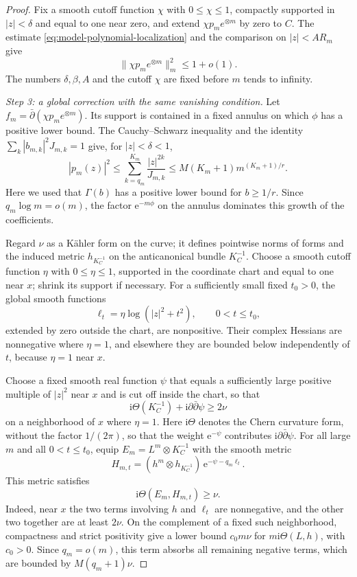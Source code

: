 \begin{proof}
Fix a smooth cutoff function $\chi$ with $0\leq\chi\leq1$, compactly supported in $|z|<\delta$ and equal to one near zero, and extend $\chi p_m e^{\otimes m}$ by zero to $C$. The estimate \eqref{eq:model-polynomial-localization} and the comparison on $|z|<A R_m$ give
\begin{equation}\label{eq:cutoff-polynomial-norm}
 \|\chi p_m e^{\otimes m}\|_m^2\leq1+o(1).
\end{equation}
The numbers $\delta,\beta,A$ and the cutoff $\chi$ are fixed before $m$ tends to infinity.

\emph{Step 3: a global correction with the same vanishing condition.}
Let $f_m=\bar\partial(\chi p_m e^{\otimes m})$. Its support is contained in a fixed annulus on which $\phi$ has a positive lower bound. The Cauchy--Schwarz inequality and the identity $\sum_k|b_{m,k}|^2J_{m,k}=1$ give, for $|z|<\delta<1$,
\[
 |p_m(z)|^2\leq\sum_{k=q_m}^{K_m}\frac{|z|^{2k}}{J_{m,k}}
 \leq M(K_m+1)m^{(K_m+1)/r}.
\]
Here we used that $\Gamma(b)$ has a positive lower bound for $b\geq1/r$. Since $q_m\log m=o(m)$, the factor $\mathrm{e}^{-m\phi}$ on the annulus dominates this growth of the coefficients.

Regard $\nu$ as a K\"ahler form on the curve; it defines pointwise norms of forms and the induced metric $h_{K_C^{-1}}$ on the anticanonical bundle $K_C^{-1}$. Choose a smooth cutoff function $\eta$ with $0\leq\eta\leq1$, supported in the coordinate chart and equal to one near $x$; shrink its support if necessary. For a sufficiently small fixed $t_0>0$, the global smooth functions
\[
 \ell_t=\eta\log(|z|^2+t^2),\qquad 0<t\leq t_0,
\]
extended by zero outside the chart, are nonpositive. Their complex Hessians are nonnegative where $\eta=1$, and elsewhere they are bounded below independently of $t$, because $\eta=1$ near $x$.

Choose a fixed smooth real function $\psi$ that equals a sufficiently large positive multiple of $|z|^2$ near $x$ and is cut off inside the chart, so that
\[
 \mathrm{i}\Theta(K_C^{-1})+\mathrm{i}\partial\bar\partial\psi\geq2\nu
\]
on a neighborhood of $x$ where $\eta=1$. Here $\mathrm{i}\Theta$ denotes the Chern curvature form, without the factor $1/(2\pi)$, so that the weight $\mathrm{e}^{-\psi}$ contributes $\mathrm{i}\partial\bar\partial\psi$. For all large $m$ and all $0<t\leq t_0$, equip
$E_m=L^m\otimes K_C^{-1}$ with the smooth metric
\[
 H_{m,t}=(h^m\otimes h_{K_C^{-1}})\,
                     \mathrm{e}^{-\psi-q_m\ell_t}.
\]
This metric satisfies
\begin{equation}\label{eq:jet-correction-curvature}
 \mathrm{i}\Theta(E_m,H_{m,t})\geq\nu.
\end{equation}
Indeed, near $x$ the two terms involving $h$ and $\ell_t$ are nonnegative, and the other two together are at least $2\nu$. On the complement of a fixed such neighborhood, compactness and strict positivity give a lower bound $c_0m\nu$ for $m\mathrm{i}\Theta(L,h)$, with $c_0>0$. Since $q_m=o(m)$, this term absorbs all remaining negative terms, which are bounded by $M(q_m+1)\nu$.


\end{proof}
